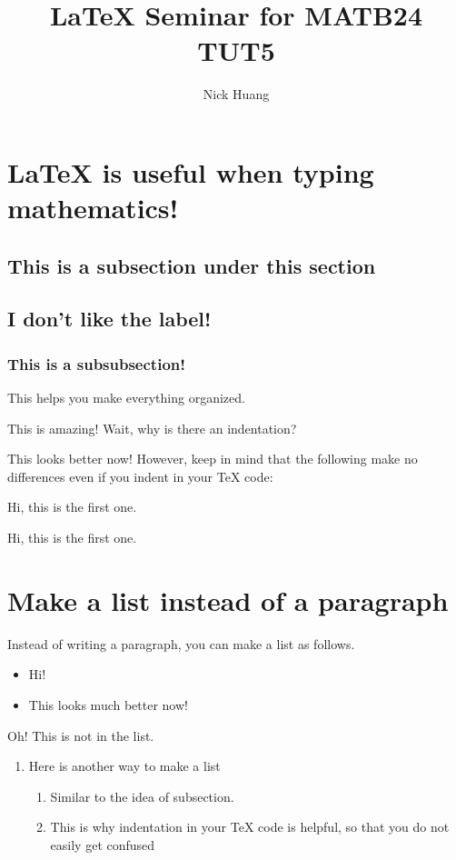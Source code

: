 \documentclass{article}
\title{LaTeX Seminar for MATB24 TUT5}
\author{Nick Huang}
\begin{document}

\maketitle %

\section{LaTeX is useful when typing mathematics!}
\subsection{This is a subsection under this section}
\subsection*{I don't like the label!}
\subsubsection{This is a subsubsection!}

This helps you make everything organized.

This is amazing! Wait, why is there an indentation?

\setlength\parindent{0pt}

This looks better now! However, keep in mind that the following make no differences even if you indent in your TeX code:

Hi, this is the first one.

    Hi, this is the first one.

\section{Make a list instead of a paragraph}

Instead of writing a paragraph, you can make a list as follows.

    \begin{itemize}
        \item Hi!
        \item This looks much better now!
    \end{itemize}
    
    Oh! This is not in the list.
    
    \begin{enumerate}
        \item Here is another way to make a list
            \begin{enumerate}
                \item Similar to the idea of subsection.
                \item This is why indentation in your TeX code is helpful, so that you do not easily get confused
            \end{enumerate}
    \end{enumerate}
\end{document}
